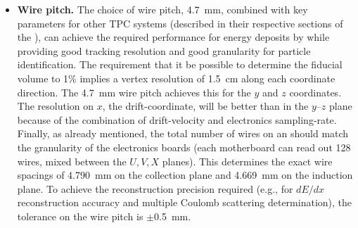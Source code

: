 \begin{itemize}
\item \textbf{Wire pitch.} 
The choice of wire pitch, \SI{4.7}{mm}, combined with key parameters for other TPC systems (described in their respective sections of the ), can achieve the required performance for energy deposits by  while providing good tracking resolution and good granularity for particle identification. The \single requirement that it be possible to determine the fiducial volume to \num{1}\% implies a vertex resolution of \SI{1.5}{cm} along each coordinate direction. The \SI{4.7}{mm} wire pitch achieves this for the $y$ and $z$ coordinates.  The resolution on $x$, the drift-coordinate, will be better than in the $y$--$z$ plane because of the combination of drift-velocity and electronics sampling-rate.  Finally, as already mentioned, the total number of wires on an  should match the granularity of the electronics boards (each  motherboard can read out \num{128} wires, mixed between the $U,V,X$ planes). This determines the exact wire spacings of \SI{4.790}{mm} on the collection plane and \SI{4.669}{mm} on the induction plane.  To achieve the reconstruction precision required (e.g., for $dE/dx$ reconstruction accuracy and multiple Coulomb scattering determination), the tolerance on the wire pitch is $\pm$\SI{0.5}{mm}.


\end{itemize}
